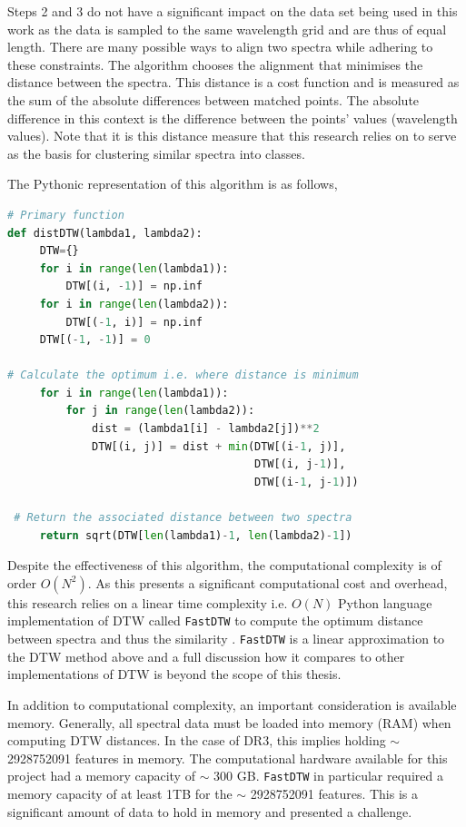 Steps 2 and 3 do not have a significant impact on the data set being used in this work as the data is sampled to the same wavelength grid and are thus of equal length. There are many possible ways to align two spectra while adhering to these constraints. The algorithm chooses the alignment that minimises the distance between the spectra. This distance is a cost function and is measured as the sum of the absolute differences between matched points. The absolute difference in this context is the difference between the points' values (wavelength values). Note that it is this distance measure that this research relies on to serve as the basis for clustering similar spectra into classes.


The Pythonic representation of this algorithm is as follows,

\begin{lstlisting}[language=Python]
# Primary function
def distDTW(lambda1, lambda2):
     DTW={}
     for i in range(len(lambda1)):
         DTW[(i, -1)] = np.inf
     for i in range(len(lambda2)):
         DTW[(-1, i)] = np.inf
     DTW[(-1, -1)] = 0
 
# Calculate the optimum i.e. where distance is minimum
     for i in range(len(lambda1)):
         for j in range(len(lambda2)):
             dist = (lambda1[i] - lambda2[j])**2
             DTW[(i, j)] = dist + min(DTW[(i-1, j)],
                                      DTW[(i, j-1)], 
                                      DTW[(i-1, j-1)])
 
 # Return the associated distance between two spectra
     return sqrt(DTW[len(lambda1)-1, len(lambda2)-1])
\end{lstlisting}

Despite the effectiveness of this algorithm, the computational complexity is of order $O(N^2)$. As this presents a significant computational cost and overhead, this research relies on a linear time complexity i.e. $O(N)$ Python language implementation of DTW called \texttt{FastDTW} to compute the optimum distance between spectra and thus the similarity \cite{salvador2007toward}. \texttt{FastDTW} is a linear approximation to the DTW method above and a full discussion how it compares to other implementations of DTW is beyond the scope of this thesis. 

In addition to computational complexity, an important consideration is available memory. Generally, all spectral data must be loaded into memory (RAM) when computing DTW distances. In the case of DR3, this implies holding $\sim$ \num[round-precision=2,round-mode=figures, scientific-notation=true]{2928752091} features in memory. The computational hardware available for this project had a memory capacity of $\sim$ 300 GB. \texttt{FastDTW} in particular required a memory capacity of at least 1TB for the $\sim$ \num[round-precision=2,round-mode=figures, scientific-notation=true]{2928752091} features. This is a significant amount of data to hold in memory and presented a challenge.

